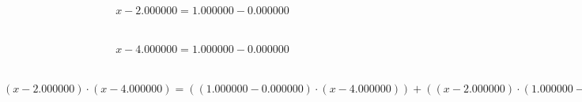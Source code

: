 \documentclass{article}
\begin{document}
$$x - 2.000000 = 1.000000 - 0.000000$$\\\\
$$x - 4.000000 = 1.000000 - 0.000000$$\\\\
$$(x - 2.000000) \cdot (x - 4.000000) = ((1.000000 - 0.000000) \cdot (x - 4.000000)) + ((x - 2.000000) \cdot (1.000000 - 0.000000))$$\\\\
\end{document}
